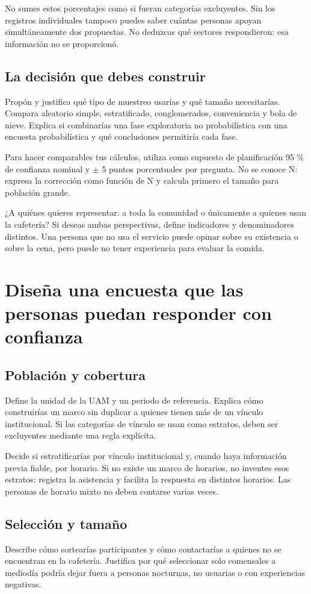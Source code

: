 \documentclass[11pt,letterpaper]{article}
\begin{document}
No sumes estos porcentajes como si fueran categorías excluyentes. Sin los registros individuales tampoco puedes saber cuántas personas apoyan simultáneamente dos propuestas. No deduzcas qué sectores respondieron: esa información no se proporcionó.

\subsection{La decisión que debes construir}
Propón y justifica qué tipo de muestreo usarías y qué tamaño necesitarías. Compara aleatorio simple, estratificado, conglomerados, conveniencia y bola de nieve. Explica si combinarías una fase exploratoria no probabilística con una encuesta probabilística y qué conclusiones permitiría cada fase.

Para hacer comparables tus cálculos, utiliza como supuesto de planificación 95 \% de confianza nominal y  $\pm$ 5 puntos porcentuales por pregunta. No se conoce N: expresa la corrección como función de N y calcula primero el tamaño para población grande.

¿A quiénes quieres representar: a toda la comunidad o únicamente a quienes usan la cafetería? Si deseas ambas perspectivas, define indicadores y denominadores distintos. Una persona que no usa el servicio puede opinar sobre su existencia o sobre la cena, pero puede no tener experiencia para evaluar la comida.

\clearpage
\section{Diseña una encuesta que las personas puedan responder con confianza}
\subsection{Población y cobertura}
Define la unidad de la UAM y un periodo de referencia. Explica cómo construirías un marco sin duplicar a quienes tienen más de un vínculo institucional. Si las categorías de vínculo se usan como estratos, deben ser excluyentes mediante una regla explícita.

Decide si estratificarías por vínculo institucional y, cuando haya información previa fiable, por horario. Si no existe un marco de horarios, no inventes esos estratos: registra la asistencia y facilita la respuesta en distintos horarios. Las personas de horario mixto no deben contarse varias veces.

\subsection{Selección y tamaño}
Describe cómo sortearías participantes y cómo contactarías a quienes no se encuentran en la cafetería. Justifica por qué seleccionar solo comensales a mediodía podría dejar fuera a personas nocturnas, no usuarias o con experiencias negativas.
\end{document}

